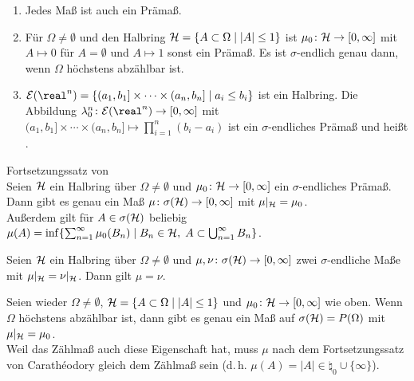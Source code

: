 \begin{Bsp}
    \begin{enumerate}
        \item
        Jedes Maß ist auch ein Prämaß.
        
        \item
        Für $\Omega \not= \emptyset$ und den Halbring $\mathcal{H} = \{A \subset \Omega \;|\; |A| \le 1\}$
        ist $\mu_0\colon \mathcal{H} \rightarrow [0, \infty]$ mit $A \mapsto 0$ für $A = \emptyset$ und
        $A \mapsto 1$ sonst ein Prämaß.
        Es ist $\sigma$-endlich genau dann, wenn $\Omega$ höchstens abzählbar ist.
        
        \item
        $\E(\real^n) = \{(a_1, b_1] \times \dotsb \times (a_n, b_n] \;|\; a_i \le b_i\}$
        ist ein Halbring.
        Die Abbildung $\lambda_0^n\colon \E(\real^n) \rightarrow [0, \infty]$ mit
        $(a_1, b_1] \times \dotsb \times (a_n, b_n] \mapsto \prod_{i=1}^n (b_i - a_i)$
        ist ein $\sigma$-endliches Prämaß und heißt .
    \end{enumerate}
\end{Bsp}

\linie

\begin{Satz}{Fortsetzungssatz von \upshape\,\!}\\
    Seien $\mathcal{H}$ ein Halbring über $\Omega \not= \emptyset$ und
    $\mu_0\colon \mathcal{H} \rightarrow [0, \infty]$ ein $\sigma$-endliches Prämaß.\\
    Dann gibt es genau ein Maß $\mu\colon \sigma(\mathcal{H}) \rightarrow [0, \infty]$ mit
    $\mu|_{\mathcal{H}} = \mu_0$.\\
    Außerdem gilt für $A \in \sigma(\mathcal{H})$ beliebig
    $\mu(A) = \inf\{\sum_{n=1}^\infty \mu_0(B_n) \;|\;
    B_n \in \mathcal{H},\; A \subset \bigcup_{n=1}^\infty B_n\}$.
\end{Satz}

\begin{Kor}
    Seien $\mathcal{H}$ ein Halbring über $\Omega \not= \emptyset$ und
    $\mu, \nu\colon \sigma(\mathcal{H}) \rightarrow [0, \infty]$ zwei $\sigma$-endliche Maße
    mit $\mu|_{\mathcal{H}} = \nu|_{\mathcal{H}}$.
    Dann gilt $\mu = \nu$.
\end{Kor}

\begin{Bsp}
    Seien wieder $\Omega \not= \emptyset$, $\mathcal{H} = \{A \subset \Omega \;|\; |A| \le 1\}$ und
    $\mu_0\colon \mathcal{H} \rightarrow [0, \infty]$ wie oben.
    Wenn $\Omega$ höchstens abzählbar ist, dann gibt es genau ein Maß auf
    $\sigma(\mathcal{H}) = P(\Omega)$ mit $\mu|_{\mathcal{H}} = \mu_0$.\\
    Weil das Zählmaß auch diese Eigenschaft hat, muss $\mu$ nach dem Fortsetzungssatz von
    Carathéodory gleich dem Zählmaß sein
    (d.\,h. $\mu(A) = |A| \in \natural_0 \cup \{\infty\}$).
\end{Bsp}


